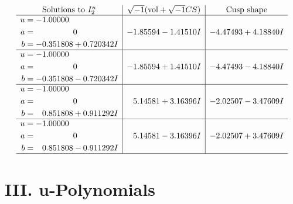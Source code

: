 \documentclass[1p]{elsarticle_modified}
\theoremstyle{definition}
\newcommand{\I}{\sqrt{-1}}
\begin{document}
$$\begin{array}{c|c|c}  
\text{Solutions to }I^u_{2}& \I (\text{vol} + \sqrt{-1}CS) & \text{Cusp shape}\\
 \hline 
\begin{aligned}
u &= -1.00000\phantom{ +0.000000I} \\
a &= \phantom{-0.000000 } 0 \\
b &= -0.351808 + 0.720342 I\end{aligned}
 & -1.85594 - 1.41510 I & -4.47493 + 4.18840 I \\ \hline\begin{aligned}
u &= -1.00000\phantom{ +0.000000I} \\
a &= \phantom{-0.000000 } 0 \\
b &= -0.351808 - 0.720342 I\end{aligned}
 & -1.85594 + 1.41510 I & -4.47493 - 4.18840 I \\ \hline\begin{aligned}
u &= -1.00000\phantom{ +0.000000I} \\
a &= \phantom{-0.000000 } 0 \\
b &= \phantom{-}0.851808 + 0.911292 I\end{aligned}
 & \phantom{-}5.14581 + 3.16396 I & -2.02507 - 3.47609 I \\ \hline\begin{aligned}
u &= -1.00000\phantom{ +0.000000I} \\
a &= \phantom{-0.000000 } 0 \\
b &= \phantom{-}0.851808 - 0.911292 I\end{aligned}
 & \phantom{-}5.14581 - 3.16396 I & -2.02507 + 3.47609 I\\
 \hline 
 \end{array}$$\newpage
\newpage\renewcommand{\arraystretch}{1}
\centering \section*{ III. u-Polynomials}
\end{document}
